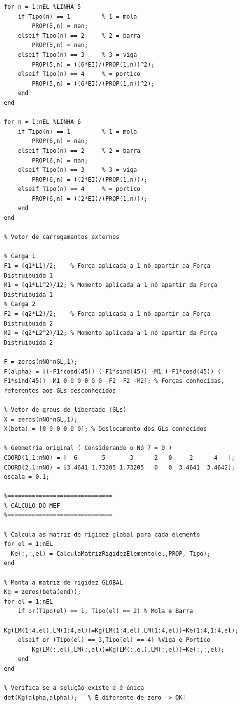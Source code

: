 \documentclass[deposito, acronym, symbols]{fei}
\begin{document}
\begin{lstlisting}
for n = 1:nEL %LINHA 5
    if Tipo(n) == 1         % 1 = mola
        PROP(5,n) = nan;
    elseif Tipo(n) == 2     % 2 = barra
        PROP(5,n) = nan;
    elseif Tipo(n) == 3     % 3 = viga
        PROP(5,n) = ((6*EI)/(PROP(1,n))^2);
    elseif Tipo(n) == 4     % = portico 
        PROP(5,n) = ((6*EI)/(PROP(1,n))^2);
    end
end

for n = 1:nEL %LINHA 6
    if Tipo(n) == 1         % 1 = mola
        PROP(6,n) = nan;
    elseif Tipo(n) == 2     % 2 = barra
        PROP(6,n) = nan;
    elseif Tipo(n) == 3     % 3 = viga
        PROP(6,n) = ((2*EI)/(PROP(1,n)));
    elseif Tipo(n) == 4     % = portico 
        PROP(6,n) = ((2*EI)/(PROP(1,n)));
    end
end

% Vetor de carregamentos externos

% Carga 1
F1 = (q1*L1)/2;    % Força aplicada a 1 nó apartir da Força Distruibuida 1 
M1 = (q1*L1^2)/12; % Momento aplicada a 1 nó apartir da Força Distruibuida 1
% Carga 2
F2 = (q2*L2)/2;    % Força aplicada a 1 nó apartir da Força Distruibuida 2 
M2 = (q2*L2^2)/12; % Momento aplicada a 1 nó apartir da Força Distruibuida 2

F = zeros(nNO*nGL,1);
F(alpha) = [(-F1*cosd(45)) (-F1*sind(45)) -M1 (-F1*cosd(45)) (-F1*sind(45)) -M1 0 0 0 0 0 0 -F2 -F2 -M2]; % Forças conhecidas, referentes aos GLs desconhecidos

% Vetor de graus de liberdade (GLs)
X = zeros(nNO*nGL,1);
X(beta) = [0 0 0 0 0 0]; % Deslocamento dos GLs conhecidos

% Geometria original ( Considerando o Nó 7 = 0 )
COORD(1,1:nNO) = [  6       5       3      2   0     2      4   ];
COORD(2,1:nNO) = [3.4641 1.73205 1.73205   0   0  3.4641  3.4642];
escala = 0.1;

%==============================
% CÁLCULO DO MEF
%==============================

% Calcula as matriz de rigidez global para cada elemento
for el = 1:nEL
  Ke(:,:,el) = CalculaMatrizRigidezElemento(el,PROP, Tipo);
end

% Monta a matriz de rigidez GLOBAL
Kg = zeros(beta(end));
for el = 1:nEL
    if or(Tipo(el) == 1, Tipo(el) == 2) % Mola e Barra
        Kg(LM(1:4,el),LM(1:4,el))=Kg(LM(1:4,el),LM(1:4,el))+Ke(1:4,1:4,el);
    elseif or (Tipo(el) == 3,Tipo(el) == 4) %Viga e Portico
        Kg(LM(:,el),LM(:,el))=Kg(LM(:,el),LM(:,el))+Ke(:,:,el);
    end       
end

% Verifica se a solução existe e é única
det(Kg(alpha,alpha));   % É diferente de zero -> OK! 


\end{lstlisting}
\end{document}
